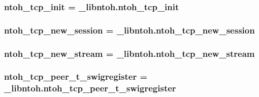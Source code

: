 \hypertarget{namespacelibntoh_a50e4b9cf1914c048d31ffaca7d255186}{
\subsubsection[{ntoh\-\_\-tcp\-\_\-init}]{\setlength{\rightskip}{0pt plus 5cm}ntoh\-\_\-tcp\-\_\-init = \-\_\-libntoh.\-ntoh\-\_\-tcp\-\_\-init}}\label{namespacelibntoh_a50e4b9cf1914c048d31ffaca7d255186}
\hypertarget{namespacelibntoh_abb5b777cb35d1287872144928b49f566}{
\subsubsection[{ntoh\-\_\-tcp\-\_\-new\-\_\-session}]{\setlength{\rightskip}{0pt plus 5cm}ntoh\-\_\-tcp\-\_\-new\-\_\-session = \-\_\-libntoh.\-ntoh\-\_\-tcp\-\_\-new\-\_\-session}}\label{namespacelibntoh_abb5b777cb35d1287872144928b49f566}
\hypertarget{namespacelibntoh_a33b87761f876b3e317a4e0ceda7859d2}{
\subsubsection[{ntoh\-\_\-tcp\-\_\-new\-\_\-stream}]{\setlength{\rightskip}{0pt plus 5cm}ntoh\-\_\-tcp\-\_\-new\-\_\-stream = \-\_\-libntoh.\-ntoh\-\_\-tcp\-\_\-new\-\_\-stream}}\label{namespacelibntoh_a33b87761f876b3e317a4e0ceda7859d2}
\hypertarget{namespacelibntoh_aac2da66c99ac56fc944321590d30ef28}{
\subsubsection[{ntoh\-\_\-tcp\-\_\-peer\-\_\-t\-\_\-swigregister}]{\setlength{\rightskip}{0pt plus 5cm}ntoh\-\_\-tcp\-\_\-peer\-\_\-t\-\_\-swigregister = \-\_\-libntoh.\-ntoh\-\_\-tcp\-\_\-peer\-\_\-t\-\_\-swigregister}}\label{namespacelibntoh_aac2da66c99ac56fc944321590d30ef28}
